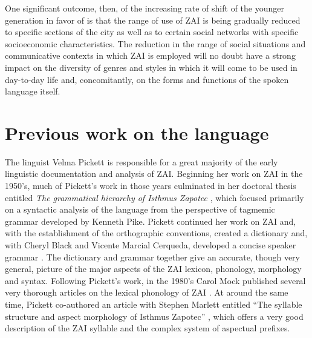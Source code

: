One significant outcome, then, of the increasing rate of shift of the younger generation in favor of  is that the range of use of ZAI is being gradually reduced to specific sections of the city as well as to certain social networks with specific socioeconomic characteristics. The reduction in the range of social situations and communicative contexts in which ZAI is employed will no doubt have a strong impact on the diversity of genres and styles in which it will come to be used in day-to-day life and, concomitantly, on the forms and functions of the spoken language itself.



\section{Previous work on the language}

The linguist Velma Pickett is responsible for a great majority of the early linguistic documentation and analysis of ZAI.  Beginning her work on ZAI in the 1950's, much of Pickett's work in those years culminated in her doctoral thesis entitled \textit{The grammatical hierarchy of Isthmus Zapotec} \citep{pickett1960}, which focused primarily on a syntactic analysis of the language from the perspective of tagmemic grammar developed by Kenneth Pike. Pickett continued her work on ZAI and, with the establishment of the orthographic conventions, created a dictionary \citep{pickett1979} and, with Cheryl Black and Vicente Marcial Cerqueda, developed a concise speaker grammar \citep{pickett1998}. The dictionary and grammar together give an accurate, though very general, picture of the major aspects of the ZAI lexicon, phonology, morphology and syntax. Following Pickett's work, in the 1980's Carol Mock published several very thorough articles on the lexical phonology of ZAI \citep{mock1983,mock1985a,mock1985b,mock1988}. At around the same time, Pickett co-authored an article with Stephen Marlett entitled ``The syllable structure and aspect morphology of Isthmus Zapotec'' \citep{marlett1987}, which offers a very good description of the ZAI syllable and the complex system of aspectual prefixes. 

